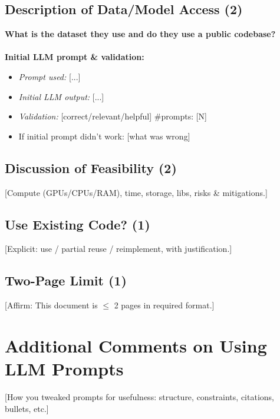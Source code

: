 \documentclass[15pt]{extarticle}
\begin{document}
\subsection*{Description of Data/Model Access (2)}
\textbf{What is the dataset they use and do they use a public codebase?}\\
[Dataset name(s), access path (public/credentialed), any repo/demo, your access plan.]
\\[2pt]
\textbf{Initial LLM prompt \& validation:}
\begin{itemize}
  \item \emph{Prompt used:} [...]
  \item \emph{Initial LLM output:} [...]
  \item \emph{Validation:} [correct/relevant/helpful] \quad \#prompts: [N]
  \item If initial prompt didn’t work: [what was wrong]
\end{itemize}

\subsection*{Discussion of Feasibility (2)}
[Compute (GPUs/CPUs/RAM), time, storage, libs, risks \& mitigations.]

\subsection*{Use Existing Code? (1)}
[Explicit: use / partial reuse / reimplement, with justification.]

\subsection*{Two-Page Limit (1)}
[Affirm: This document is $\leq$ 2 pages in required format.]

\section*{Additional Comments on Using LLM Prompts}
[How you tweaked prompts for usefulness: structure, constraints, citations, bullets, etc.]


\end{document}
